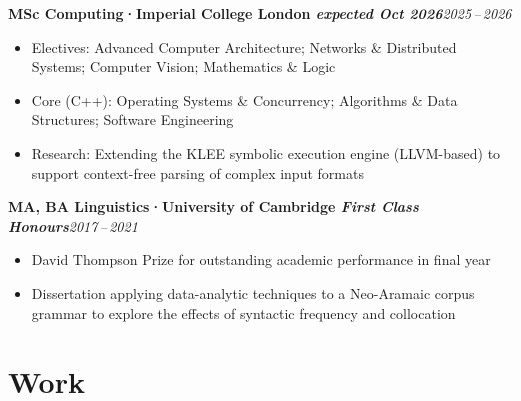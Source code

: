 \documentclass[10pt,a4paper]{article}
\newcommand{\entry}[3]{%
  \textbf{#2}\hfill{\small\textit{#1}}%
  \par\vspace{0pt}%
  #3%
}
\begin{document}
\begin{cvbox}
\entry{2025\,--\,2026}
  {MSc Computing\enspace\textcolor{accent}{·}\enspace Imperial College London \textnormal{\small\textit{expected Oct 2026}}}
  {\begin{itemize}
    \item Electives: Advanced Computer Architecture; Networks \& Distributed Systems; Computer Vision; Mathematics \& Logic
    \item Core (C++): Operating Systems \& Concurrency; Algorithms \& Data Structures; Software Engineering
    \item Research: Extending the KLEE symbolic execution engine (LLVM-based) to support context-free parsing of complex input formats
  \end{itemize}}
\end{cvbox}

\begin{cvbox}
\entry{2017\,--\,2021}
  {MA, BA Linguistics\enspace\textcolor{accent}{·}\enspace University of Cambridge \textnormal{\small\textit{First Class Honours}}}
  {\begin{itemize}
    \item David Thompson Prize for outstanding academic performance in final year
    \item Dissertation applying data-analytic techniques to a Neo-Aramaic corpus grammar to explore the effects of syntactic frequency and collocation
  \end{itemize}}
\end{cvbox}

\section{Work}
\end{document}
